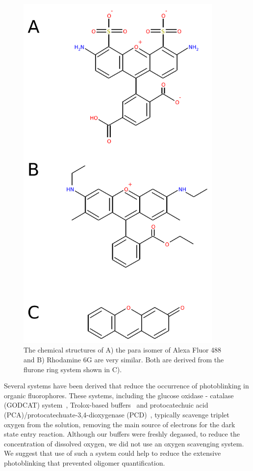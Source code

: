 \begin{figure}
   \begin{center}
      \includegraphics*[width=4in]{sizing/fluorone.pdf}
      \caption{The chemical structures of A) the para isomer of Alexa Fluor 488 and B) Rhodamine 6G are very similar. Both are derived from the flurone ring system shown in C).}
      \label{fig:fluorone}
   \end{center}
\end{figure}

Several systems have been derived that reduce the occurrence of photoblinking in organic fluorophores. These systems, including the glucose oxidase - catalase (GODCAT) system~\cite{joo2006}, Trolox-based buffers~\cite{rasnik2006} and protocatechuic acid (PCA)/protocatechuate-3,4-dioxygenase (PCD)~\cite{aitken2008}, typically scavenge triplet oxygen from the solution, removing the main source of electrons for the dark state entry reaction. Although our buffers were freshly degassed, to reduce the concentration of dissolved oxygen, we did not use an oxygen scavenging system. We suggest that use of such a system could help to reduce the extensive photoblinking that prevented oligomer quantification. 

